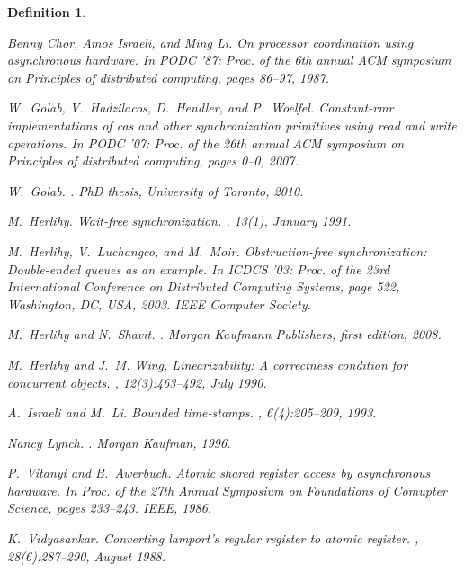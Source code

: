 \documentclass[11pt,letterpaper]{article}
\newtheorem{definition}[theorem]{Definition}
\begin{document}
\begin{definition}
\begin{thebibliography}{GHHW07}
Benny Chor, Amos Israeli, and Ming Li.
\newblock On processor coordination using asynchronous hardware.
\newblock In {\em PODC '87: Proc. of the 6th annual ACM symposium on Principles
  of distributed computing}, pages 86--97, 1987.

W.~Golab, V.~Hadzilacos, D.~Hendler, and P.~Woelfel.
\newblock Constant-rmr implementations of cas and other synchronization
  primitives using read and write operations.
\newblock In {\em PODC '07: Proc. of the 26th annual ACM symposium on
  Principles of distributed computing}, pages 0--0, 2007.

W.~Golab.
.
\newblock PhD thesis, University of Toronto, 2010.

M.~Herlihy.
\newblock Wait-free synchronization.
, 13(1), January 1991.

M.~Herlihy, V.~Luchangco, and M.~Moir.
\newblock Obstruction-free synchronization: Double-ended queues as an example.
\newblock In {\em ICDCS '03: Proc. of the 23rd International Conference on
  Distributed Computing Systems}, page 522, Washington, DC, USA, 2003. IEEE
  Computer Society.

M.~Herlihy and N.~Shavit.
.
\newblock Morgan Kaufmann Publishers, first edition, 2008.

M.~Herlihy and J.~M. Wing.
\newblock Linearizability: A correctness condition for concurrent objects.
, 12(3):463--492, July 1990.

A.~Israeli and M.~Li.
\newblock Bounded time-stamps.
, 6(4):205--209, 1993.

Nancy Lynch.
.
\newblock Morgan Kaufman, 1996.

P.~Vitanyi and B.~Awerbuch.
\newblock Atomic shared register access by asynchronous hardware.
\newblock In {\em Proc. of the 27th Annual Symposium on Foundations of Comupter
  Science}, pages 233--243. IEEE, 1986.

K.~Vidyasankar.
\newblock Converting lamport's regular register to atomic register.
, 28(6):287--290, August 1988.


\end{thebibliography}
\end{definition}
\end{document}
